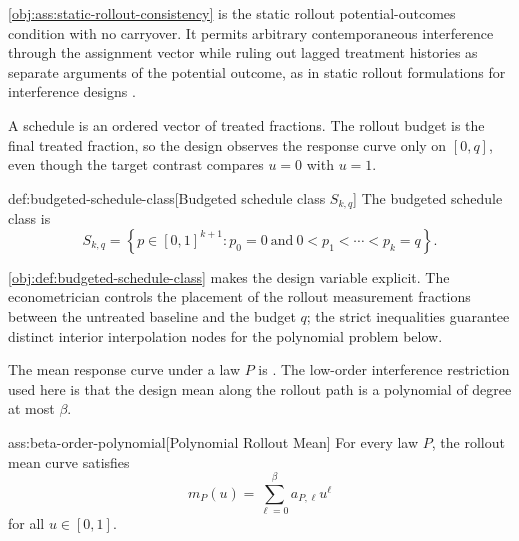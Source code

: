 \cref{obj:ass:static-rollout-consistency} is the static rollout potential-outcomes condition with no carryover. It permits arbitrary contemporaneous interference through the assignment vector while ruling out lagged treatment histories as separate arguments of the potential outcome, as in static rollout formulations for interference designs \citep{cortezrodriguez2024}.

A schedule is an ordered vector  of treated fractions. The rollout budget  is the final treated fraction, so the design observes the response curve only on \([0,q]\), even though the target contrast compares \(u=0\) with \(u=1\).

\begin{definitionv}{def:budgeted-schedule-class}[Budgeted schedule class \(S_{k,q}\)]
The budgeted schedule class is
\[
S_{k,q}
=
\left\{
p\in[0,1]^{k+1}:
p_0=0
\ \text{and}\
0<p_1<\cdots<p_k=q
\right\}.
\]
\end{definitionv}

\cref{obj:def:budgeted-schedule-class} makes the design variable explicit. The econometrician controls the placement of the rollout measurement fractions between the untreated baseline and the budget \(q\); the strict inequalities guarantee distinct interior interpolation nodes for the polynomial problem below.

The mean response curve under a law \(P\) is . The low-order interference restriction used here is that the design mean along the rollout path is a polynomial of degree at most \(\beta\).

\begin{assumptionv}{ass:beta-order-polynomial}[Polynomial Rollout Mean]
For every law \(P\), the rollout mean curve satisfies
\[
m_P(u)=\sum_{\ell=0}^{\beta} a_{P,\ell}u^\ell
\]
for all \(u\in[0,1]\).
\end{assumptionv}

